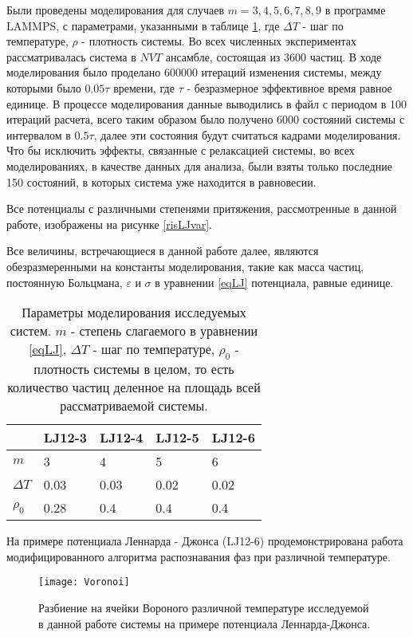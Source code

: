 Были проведены моделирования для случаев $m = 3, 4, 5, 6, 7, 8, 9$ в программе LAMMPS, с параметрами, указанными в таблице \ref{tablParam}, где $\Delta T$ - шаг по температуре,  $\rho$ - плотность системы. Во всех численных экспериментах рассматривалась система в $NVT$ ансамбле, состоящая из 3600 частиц. В ходе моделирования было проделано 600000 итераций изменения системы, между которыми было $0.05\tau$ времени, где $\tau$ - безразмерное эффективное время равное единице. В процессе моделирования данные выводились в файл с периодом в 100 итераций расчета, всего таким образом было получено 6000 состояний системы с интервалом в $0.5\tau$, далее эти состояния будут считаться кадрами моделирования. Что бы исключить эффекты, связанные с релаксацией системы, во всех моделированиях, в качестве данных для анализа, были взяты только последние 150 состояний, в которых система уже находится в равновесии.

Все потенциалы с различными степенями притяжения, рассмотренные в данной работе, изображены на рисунке \ref{risLJvar}.

Все величины, встречающиеся в данной работе далее, являются обезразмеренными на константы моделирования, такие как масса частиц, постоянную Больцмана, $\varepsilon$ и $\sigma$ в уравнении \ref{eqLJ} потенциала, равные единице.

\begin{table}[h]
\begin{center}
\begin{tabular}{| l | l | l | l | l |}
\hline
    & LJ12-3 & LJ12-4 & LJ12-5 & LJ12-6 \\ \hline
$m$   &    3    &     4   &    5    &    6    \\ \hline
$\Delta T$ & 0.03 & 0.03 & 0.02 & 0.02 \\ \hline
$\rho_0$ & 0.28  &  0.4  &  0.4  &  0.4  \\ \hline
\end{tabular}
\end{center}
\caption{Параметры моделирования исследуемых систем. $m$ - степень слагаемого в уравнении \ref{eqLJ}, $\Delta T$ - шаг по температуре,  $\rho_0$ - плотность системы в целом, то есть количество частиц деленное на площадь всей рассматриваемой системы.}
\label{tablParam}
\end{table}

На примере потенциала Леннарда - Джонса (LJ12-6) продемонстрирована работа модифицированного алгоритма распознавания фаз при различной температуре.

\begin{figure}[h]
\begin{center}
\texttt{[image: Voronoi]}
\caption{Разбиение на ячейки Вороного различной температуре исследуемой в данной работе системы на примере потенциала Леннарда-Джонса.}
\label{risvoronoiExp}
\end{center}
\end{figure}

